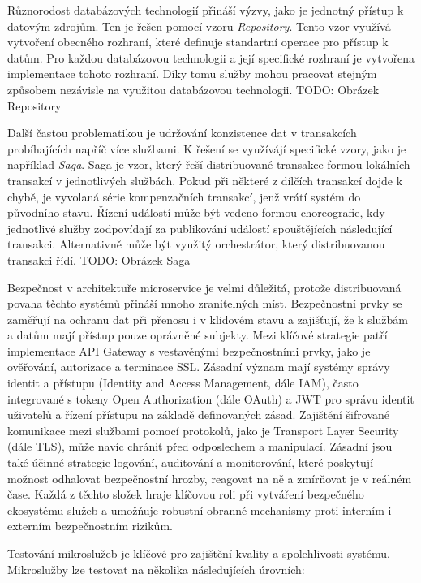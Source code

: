 Různorodost databázových technologií přináší výzvy, jako je jednotný přístup k datovým zdrojům. Ten je řešen pomocí vzoru \emph{Repository}. Tento vzor využívá vytvoření obecného rozhraní, které definuje standartní operace pro přístup k datům. Pro každou databázovou technologii a její specifické rozhraní je vytvořena implementace tohoto rozhraní. Díky tomu služby mohou pracovat stejným způsobem nezávisle na využitou databázovou technologii.
TODO: Obrázek Repository

Další častou problematikou je udržování konzistence dat v transakcích probíhajících napříč více službami. K řešení se využívájí specifické vzory, jako je například \emph{Saga}. Saga je vzor, který řeší distribuované transakce formou lokálních transakcí v jednotlivých službách. Pokud při některé z dílčích transakcí dojde k chybě, je vyvolaná série kompenzačních transakcí, jenž vrátí systém do původního stavu. Řízení událostí může být vedeno formou choreografie, kdy jednotlivé služby zodpovídají za publikování událostí spouštějících následující transakci. Alternativně může být využitý orchestrátor, který distribuovanou transakci řídí. \cite{richardsonsaga}
TODO: Obrázek Saga


Bezpečnost v architektuře microservice je velmi důležitá, protože distribuovaná povaha těchto systémů přináší mnoho zranitelných míst. Bezpečnostní prvky se zaměřují na ochranu dat při přenosu i v klidovém stavu a zajišťují, že k službám a datům mají přístup pouze oprávněné subjekty. Mezi klíčové strategie patří implementace API Gateway s vestavěnými bezpečnostními prvky, jako je ověřování, autorizace a terminace SSL. Zásadní význam mají systémy správy identit a přístupu (Identity and Access Management, dále IAM), často integrované s tokeny Open Authorization (dále OAuth) a JWT pro správu identit uživatelů a řízení přístupu na základě definovaných zásad. Zajištění šifrované komunikace mezi službami pomocí protokolů, jako je Transport Layer Security (dále TLS), může navíc chránit před odposlechem a manipulací. Zásadní jsou také účinné strategie logování, auditování a monitorování, které poskytují možnost odhalovat bezpečnostní hrozby, reagovat na ně a zmírňovat je v reálném čase. Každá z těchto složek hraje klíčovou roli při vytváření bezpečného ekosystému služeb a umožňuje robustní obranné mechanismy proti interním i externím bezpečnostním rizikům.


Testování mikroslužeb je klíčové pro zajištění kvality a spolehlivosti systému. Mikroslužby lze testovat na několika následujících úrovních:

